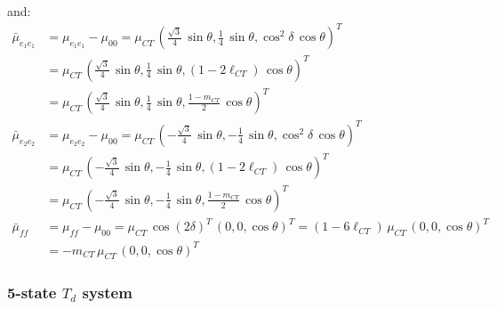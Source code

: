\documentclass[journal=jpcafh]{achemso}
\begin{document}
and:
\begin{align}
	\bar\mu_{e_1e_1}&= \mu_{e_1e_1}-\mu_{00} = \mu_{CT}\,\left(\frac{\sqrt{3}}{4}\,\sin\theta, \frac{1}{4}\,\sin\theta, \cos^2\delta\,\cos\theta\right)^T\nonumber\\
	&= \mu_{CT}\,\left(\frac{\sqrt{3}}{4}\,\sin\theta, \frac{1}{4}\,\sin\theta,(1-2\ell_{CT})\,\cos\theta\right)^T\nonumber\\
	&= \mu_{CT}\,\left(\frac{\sqrt{3}}{4}\,\sin\theta, \frac{1}{4}\,\sin\theta,\frac{1-m_{CT}}{2}\,\cos\theta\right)^T \\
	\bar\mu_{e_2e_2}&= \mu_{e_2e_2}-\mu_{00} = \mu_{CT}\,\left(-\frac{\sqrt{3}}{4}\,\sin\theta, -\frac{1}{4}\,\sin\theta, \cos^2\delta\,\cos\theta\right)^T \nonumber\\
	&= \mu_{CT}\,\left(-\frac{\sqrt{3}}{4}\,\sin\theta, -\frac{1}{4}\,\sin\theta,(1-2\ell_{CT})\,\cos\theta\right)^T\nonumber\\
	&= \mu_{CT}\,\left(-\frac{\sqrt{3}}{4}\,\sin\theta, -\frac{1}{4}\,\sin\theta,\frac{1-m_{CT}}{2}\,\cos\theta\right)^T \\
	\bar\mu_{ff} &= \mu_{ff}-\mu_{00} = \mu_{CT}\,\cos(2\delta)^T\,(0, 0, \cos\theta)^T = (1-6\ell_{CT})\,\mu_{CT}\,(0, 0, \cos\theta)^T\nonumber\\ 
	&= -m_{CT}\,\mu_{CT}\,(0, 0, \cos\theta)^T
\end{align}

\subsubsection{5-state $T_d$ system}
\end{document}
